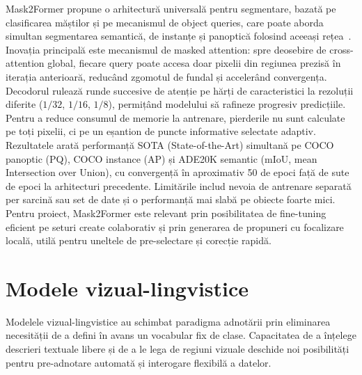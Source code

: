 Mask2Former propune o arhitectură universală pentru segmentare, bazată pe clasificarea măștilor și pe mecanismul de object queries, care poate aborda simultan segmentarea semantică, de instanțe și panoptică folosind aceeași rețea~\cite{cheng2022maskedattentionmasktransformeruniversal}. Inovația principală este mecanismul de masked attention: spre deosebire de cross-attention global, fiecare query poate accesa doar pixelii din regiunea prezisă în iterația anterioară, reducând zgomotul de fundal și accelerând convergența. Decodorul rulează runde succesive de atenție pe hărți de caracteristici la rezoluții diferite ($1/32$, $1/16$, $1/8$), permițând modelului să rafineze progresiv predicțiile. Pentru a reduce consumul de memorie la antrenare, pierderile nu sunt calculate pe toți pixelii, ci pe un eșantion de puncte informative selectate adaptiv. Rezultatele arată performanță SOTA (State-of-the-Art) simultană pe COCO panoptic (PQ), COCO instance (AP) și ADE20K semantic (mIoU, mean Intersection over Union), cu convergență în aproximativ 50 de epoci față de sute de epoci la arhitecturi precedente. Limitările includ nevoia de antrenare separată per sarcină sau set de date și o performanță mai slabă pe obiecte foarte mici. Pentru proiect, Mask2Former este relevant prin posibilitatea de fine-tuning eficient pe seturi create colaborativ și prin generarea de propuneri cu focalizare locală, utilă pentru uneltele de pre-selectare și corecție rapidă.

\section{Modele vizual-lingvistice}

Modelele vizual-lingvistice au schimbat paradigma adnotării prin eliminarea necesității de a defini în avans un vocabular fix de clase. Capacitatea de a înțelege descrieri textuale libere și de a le lega de regiuni vizuale deschide noi posibilități pentru pre-adnotare automată și interogare flexibilă a datelor.

